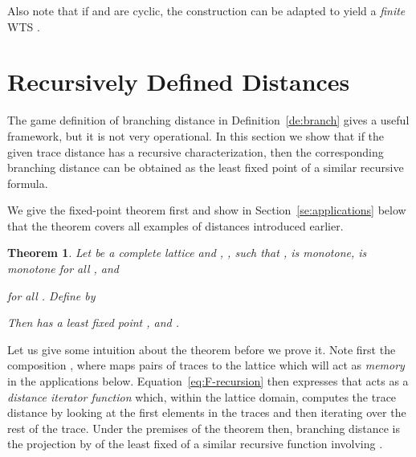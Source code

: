\documentclass[copyright,creativecommons,sharealike]{eptcs}
\theoremstyle{plain}
\newtheorem{theorem}{Theorem}
\begin{document}
Also note that if  and  are cyclic, the construction can
be adapted to yield a \emph{finite} WTS .

\section{Recursively Defined Distances}
\label{sec:special}

The game definition of branching distance in
Definition~\ref{de:branch} gives a useful framework, but it is not
very operational.  In this section we show that if the given trace
distance has a recursive characterization, then the corresponding
branching distance can be obtained as the least fixed point of a
similar recursive formula.

We give the fixed-point theorem first and show in
Section~\ref{se:applications} below that the theorem covers all
examples of distances introduced earlier.

\begin{theorem}
  \label{th:F-recursion}
  Let  be a complete lattice and , ,  such that
  ,  is monotone,  is
  monotone for all , and
  
  for all .  Define  by
  
  Then  has a least fixed point , and .
\end{theorem}

Let us give some intuition about the theorem before we prove it.  Note
first the composition , where  maps pairs of traces
to the lattice  which will act as \emph{memory} in the applications
below.  Equation~\eqref{eq:F-recursion} then expresses that  acts
as a \emph{distance iterator function} which, within the lattice
domain, computes the trace distance by looking at the first elements
in the traces and then iterating over the rest of the trace.  Under
the premises of the theorem then, branching distance is the projection
by  of the least fixed of a similar recursive function involving
.
\end{document}

